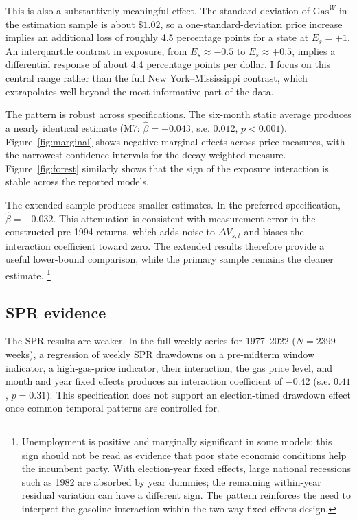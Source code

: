 \documentclass[12pt]{article}
\begin{document}
This is also a substantively meaningful effect. The standard deviation of $\mathrm{Gas}^W$ in the estimation sample is about $\$1.02$, so a one-standard-deviation price increase implies an additional loss of roughly 4.5 percentage points for a state at $E_s=+1$. An interquartile contrast in exposure, from $E_s\approx-0.5$ to $E_s\approx+0.5$, implies a differential response of about 4.4 percentage points per dollar. I focus on this central range rather than the full New York--Mississippi contrast, which extrapolates well beyond the most informative part of the data.

The pattern is robust across specifications. The six-month static average produces a nearly identical estimate (M7: $\hat\beta=-0.043$, s.e. $0.012$, $p<0.001$). Figure~\ref{fig:marginal} shows negative marginal effects across price measures, with the narrowest confidence intervals for the decay-weighted measure. Figure~\ref{fig:forest} similarly shows that the sign of the exposure interaction is stable across the reported models.

The extended sample produces smaller estimates. In the preferred specification, $\hat\beta=-0.032$. This attenuation is consistent with measurement error in the constructed pre-1994 returns, which adds noise to $\Delta V_{s,t}$ and biases the interaction coefficient toward zero. The extended results therefore provide a useful lower-bound comparison, while the primary sample remains the cleaner estimate. \footnote{Unemployment is positive and marginally significant in some models; this sign should not be read as evidence that poor state economic conditions help the incumbent party. With election-year fixed effects, large national recessions such as 1982 are absorbed by year dummies; the remaining within-year residual variation can have a different sign. The pattern reinforces the need to interpret the gasoline interaction within the two-way fixed effects design.}

\subsection{SPR evidence}

The SPR results are weaker. In the full weekly series for 1977--2022 ($N=2399$ weeks), a regression of weekly SPR drawdowns on a pre-midterm window indicator, a high-gas-price indicator, their interaction, the gas price level, and month and year fixed effects produces an interaction coefficient of $-0.42$ (s.e. $0.41$, $p=0.31$). This specification does not support an election-timed drawdown effect once common temporal patterns are controlled for.
\end{document}
